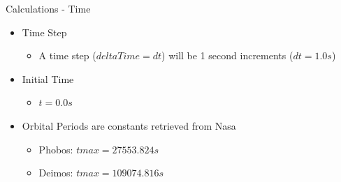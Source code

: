 \documentclass{beamer}  %
\begin{document}
\begin{frame}{Calculations - Time}

\begin{itemize}
	\item Time Step
	\begin{itemize}
		\item A time step ($deltaTime = dt$) will be 1 second increments ($dt = 1.0s$)
	\end{itemize}
	\item Initial Time
	\begin{itemize}
		\item $t = 0.0s$
	\end{itemize}
	\item Orbital Periods are constants retrieved from Nasa
	\begin{itemize}
		\item Phobos: $tmax = 27553.824s$
		\item Deimos: $tmax = 109074.816s$
	\end{itemize}
\end{itemize}

\end{frame}
\end{document}
